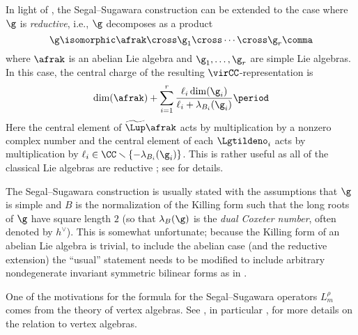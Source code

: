 \begin{remark}
	In light of , the Segal--Sugawara construction can be extended to the case where $ \g $ is \textit{reductive}, i.e., $ \g $ decomposes as a product
	\begin{equation*}
		\g \isomorphic \afrak \cross \g_1 \cross \cdots \cross \g_r \comma
	\end{equation*}
	where $ \afrak $ is an abelian Lie algebra and $ \g_1,\ldots,\g_r $ are simple Lie algebras.
	In this case, the central charge of the resulting $ \virCC $-representation is 
	\begin{equation*}
		\dim(\afrak) + \sum_{i=1}^r \frac{\ell_i \dim(\g_i)}{\ell_i + \lambda_{B_i}(\g_i)} \period
	\end{equation*}
	Here the central element of $ \widetilde{\Lup}\afrak $ acts by multiplication by a nonzero complex number and the central element of each $ \Lgtildeno_i $ acts by multiplication by $ \ell_i \in \CC \smallsetminus \{ - \lambda_{B_i}(\g_i) \} $. 
	This is rather useful as all of the classical Lie algebras are reductive \cite[Theorem 5.49]{MR2440737}; see \cite[Remark 10.3]{MR1021978} for details.
\end{remark}

\begin{remark}
	The Segal--Sugawara construction is usually stated with the assumptions that $ \g $ is simple and $ B $ is the normalization of the Killing form such that the long roots of $ \g $ have square length $ 2 $ (so that $ \lambda_{B}(\g) $ is the \textit{dual Coxeter number}, often denoted by $ h^{\vee} $).
	This is somewhat unfortunate; because the Killing form of an abelian Lie algebra is trivial, to include the
	abelian case (and the reductive extension) the ``usual'' statement needs to be modified to include arbitrary nondegenerate invariant symmetric bilinear forms as in .
\end{remark}

\begin{remark}
	One of the motivations for the formula for the Segal--Sugawara operators $ L_m^{\rho} $ comes from the theory of vertex algebras.
	See \cite[\S3]{MR2079371}, in particular \cite[Proposition 3.3.1]{MR2079371}, for more details on the relation
	to vertex algebras.
\end{remark}
